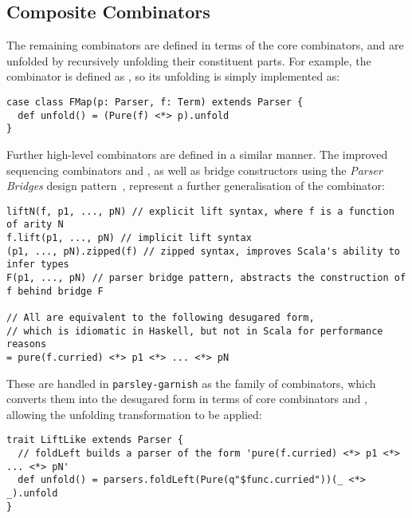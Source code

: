 \documentclass[../../main.tex]{subfiles}
\begin{document}
\subsection{Composite Combinators}\label{sec:desguar-combinators}
The remaining combinators are defined in terms of the core combinators, and are unfolded by recursively unfolding their constituent parts.
For example, the  combinator is defined as , so its unfolding is simply implemented as:
\begin{verbatim}
case class FMap(p: Parser, f: Term) extends Parser {
  def unfold() = (Pure(f) <*> p).unfold
}
\end{verbatim}
%
Further high-level combinators are defined in a similar manner.
The improved sequencing combinators  and , as well as bridge constructors using the \emph{Parser Bridges} design pattern~\cite{willis_design_2022}, represent a further generalisation of the  combinator:
\begin{verbatim}
liftN(f, p1, ..., pN) // explicit lift syntax, where f is a function of arity N
f.lift(p1, ..., pN) // implicit lift syntax
(p1, ..., pN).zipped(f) // zipped syntax, improves Scala's ability to infer types
F(p1, ..., pN) // parser bridge pattern, abstracts the construction of f behind bridge F

// All are equivalent to the following desugared form,
// which is idiomatic in Haskell, but not in Scala for performance reasons
= pure(f.curried) <*> p1 <*> ... <*> pN
\end{verbatim}
%
These are handled in \texttt{parsley-garnish} as the  family of combinators, which converts them into the desugared form in terms of core combinators  and \scala{<*>}, allowing the unfolding transformation to be applied:
\begin{verbatim}
trait LiftLike extends Parser {
  // foldLeft builds a parser of the form 'pure(f.curried) <*> p1 <*> ... <*> pN'
  def unfold() = parsers.foldLeft(Pure(q"$func.curried"))(_ <*> _).unfold
}
\end{verbatim}
\end{document}
